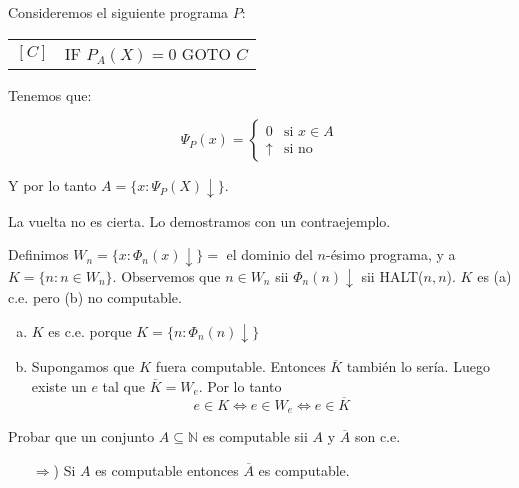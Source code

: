 \begin{questions}
\begin{solution}
 Consideremos el siguiente programa $P$: 
 
 \vspace{0.5cm}
  \begin{tabular}{rl}
    $[C]$ & IF $P_A(X)=0$ GOTO $C$ \\
  \end{tabular}
 \vspace{0.5cm}
 
 Tenemos que: 
 
  \begin{equation*}
    \Psi_P(x) = \left\{ \begin{matrix} 
      0 & \text{si } x\in A \\ 
      \uparrow & \text{si no}
    \end{matrix} \right.
  \end{equation*}

 Y por lo tanto $A = \{x : \Psi_P(X)\downarrow\}$. 
 
 La vuelta no es cierta. Lo demostramos con un contraejemplo. 
 
 Definimos $W_n=\{ x : \Phi_n(x)\downarrow\} = $ el dominio del $n$-\'esimo programa, y a $K=\{n : n\in W_n\}$. Observemos que $n\in W_n$ sii $\Phi_n(n)\downarrow$ sii HALT($n,n$). $K$ es (a) c.e. pero (b) no computable. 
 
 \begin{enumerate}[(a)]
 \item $K$ es c.e. porque $K=\{n : \Phi_n(n)\downarrow\}$
 \item Supongamos que $K$ fuera computable. Entonces $\overline{K}$ tambi\'en lo ser\'ia. Luego existe un $e$ tal que $\overline{K}=W_e$. Por lo tanto
 \begin{equation*}
  e \in K \Leftrightarrow e \in W_e \Leftrightarrow e\in \overline{K}
 \end{equation*}

 \end{enumerate}

\end{solution}

\question Probar que un conjunto $A\subseteq \mathbb{N}$ es computable sii $A$ y $\overline{A}$ son c.e.


\begin{solution}
\begin{itemize}
 \item[$\Rightarrow$)] Si $A$ es computable entonces $\overline{A}$ es computable. 
 

\end{itemize}
\end{solution}
\end{questions}
